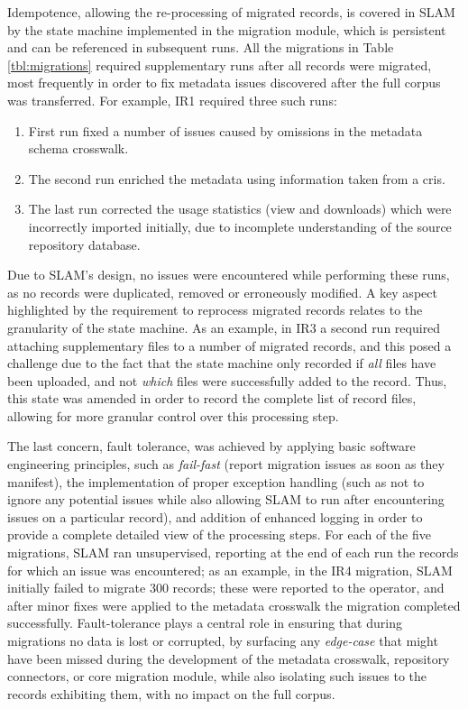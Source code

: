 Idempotence, allowing the re-processing of migrated records, is covered in SLAM by the state machine implemented in the migration module, which is persistent and can be referenced in subsequent runs. All the migrations in Table \ref{tbl:migrations} required supplementary runs after all records were migrated, most frequently in order to fix metadata issues discovered after the full corpus was transferred. For example, IR1 required three such runs:
\begin{enumerate}
    \item First run fixed a number of issues caused by omissions in the metadata schema crosswalk.
    \item The second run enriched the metadata using information taken from a \gls{cris}.
    \item The last run corrected the usage statistics (view and downloads) which were incorrectly imported initially, due to incomplete understanding of the source repository database.
\end{enumerate}
Due to SLAM's design, no issues were encountered while performing these runs, as no records were duplicated, removed or erroneously modified. A key aspect highlighted by the requirement to reprocess migrated records relates to the granularity of the state machine. As an example, in IR3 a second run required attaching supplementary files to a number of migrated records, and this posed a challenge due to the fact that the state machine only recorded if \emph{all} files have been uploaded, and not \emph{which} files were successfully added to the record. Thus, this state was amended in order to record the complete list of record files, allowing for more granular control over this processing step. 
    
The last concern, fault tolerance, was achieved by applying basic software engineering principles, such as \emph{fail-fast} (report migration issues as soon as they manifest), the implementation of proper exception handling (such as not to ignore any potential issues while also allowing SLAM to run after encountering issues on a particular record), and addition of enhanced logging in order to provide a complete detailed view of the processing steps. For each of the five migrations, SLAM ran unsupervised, reporting at the end of each run the records for which an issue was encountered; as an example, in the IR4 migration, SLAM initially failed to migrate 300 records; these were reported to the operator, and after minor fixes were applied to the metadata crosswalk the migration completed successfully. Fault-tolerance plays a central role in ensuring that during migrations no data is lost or corrupted, by surfacing any \emph{edge-case} that might have been missed during the development of the metadata crosswalk, repository connectors, or core migration module, while also isolating such issues to the records exhibiting them, with no impact on the full corpus. 

